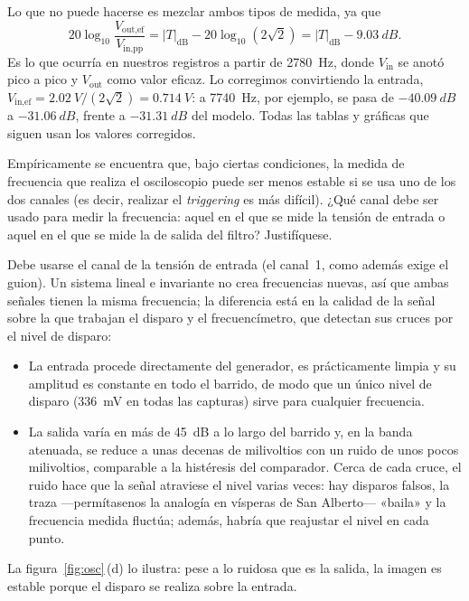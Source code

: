 \documentclass[a4paper,11pt]{article}
\newcommand{\Vin}{V_{\text{in}}}
\newcommand{\Vout}{V_{\text{out}}}
\newcommand{\pp}{\text{pp}}
\newcommand{\ef}{\text{ef}}
\begin{document}
Lo que no puede hacerse es mezclar ambos tipos de medida, ya que
\begin{equation}
  20\log_{10}\frac{V_{\text{out},\ef}}{V_{\text{in},\pp}}
  =|T|_{\text{dB}}-20\log_{10}\!\left(2\sqrt2\right)
  =|T|_{\text{dB}}-\qty{9.03}{dB}.
\end{equation}
Es lo que ocurría en nuestros registros a partir de \qty{2780}{Hz}, donde $\Vin$ se anotó pico a pico y $\Vout$ como valor eficaz. Lo corregimos convirtiendo la entrada, $V_{\text{in},\ef}=\qty{2.02}{V}/(2\sqrt2)=\qty{0.714}{V}$: a \qty{7740}{Hz}, por ejemplo, se pasa de $\qty{-40.09}{dB}$ a $\qty{-31.06}{dB}$, frente a $\qty{-31.31}{dB}$ del modelo. Todas las tablas y gráficas que siguen usan los valores corregidos.

\begin{pregunta}
Empíricamente se encuentra que, bajo ciertas condiciones, la medida de frecuencia que realiza el osciloscopio puede ser menos estable si se usa uno de los dos canales (es decir, realizar el \emph{triggering} es más difícil). ¿Qué canal debe ser usado para medir la frecuencia: aquel en el que se mide la tensión de entrada o aquel en el que se mide la de salida del filtro? Justifíquese.
\end{pregunta}

Debe usarse el canal de la tensión de entrada (el canal~1, como además exige el guion). Un sistema lineal e invariante no crea frecuencias nuevas, así que ambas señales tienen la misma frecuencia; la diferencia está en la calidad de la señal sobre la que trabajan el disparo y el frecuencímetro, que detectan sus cruces por el nivel de disparo:
\begin{itemize}
  \item La entrada procede directamente del generador, es prácticamente limpia y su amplitud es constante en todo el barrido, de modo que un único nivel de disparo (\qty{336}{mV} en todas las capturas) sirve para cualquier frecuencia.
  \item La salida varía en más de \qty{45}{dB} a lo largo del barrido y, en la banda atenuada, se reduce a unas decenas de milivoltios con un ruido de unos pocos milivoltios, comparable a la histéresis del comparador. Cerca de cada cruce, el ruido hace que la señal atraviese el nivel varias veces: hay disparos falsos, la traza ---permítasenos la analogía en vísperas de San Alberto--- «baila» y la frecuencia medida fluctúa; además, habría que reajustar el nivel en cada punto.
\end{itemize}
La figura~\ref{fig:osc}\,(d) lo ilustra: pese a lo ruidosa que es la salida, la imagen es estable porque el disparo se realiza sobre la entrada.
\end{document}
